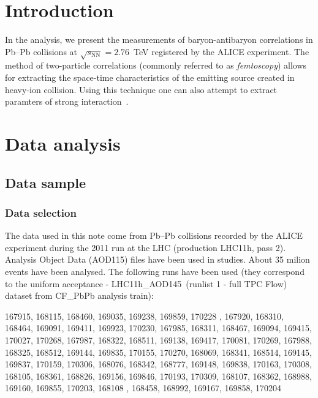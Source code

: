 \newpage
\section{Introduction}
\label{sec:overview}
In the analysis, we present the measurements of baryon-antibaryon correlations in Pb--Pb collisions at $\sqrt{s_{\mathrm{NN}}}=2.76$~TeV registered by the ALICE experiment. The method of two-particle correlations (commonly referred to as \emph{femtoscopy})  allows for extracting the space-time characteristics of the emitting source created in heavy-ion collision. Using this technique one can also attempt to extract paramters of strong interaction~\cite{}.

\section{Data analysis}
\label{sec:analysis}
\subsection{Data sample}
\subsubsection{Data selection}
The data used in this note come from Pb--Pb collisions recorded by the ALICE experiment during the 2011 run at the LHC (production LHC11h, pass 2). Analysis Object Data (AOD115) files have been used in studies. About 35 milion events have been analysed. The following runs have been used
(they correspond to the uniform acceptance - LHC11h\_AOD145\ (runlist 1 - full TPC Flow) dataset from  CF\_PbPb analysis train):

167915, 168115, 168460, 169035, 169238, 169859, 170228 , 167920, 168310, 168464, 169091, 169411, 169923, 170230, 167985, 168311, 168467, 169094, 169415, 170027, 170268, 167987, 168322, 168511, 169138, 169417, 170081, 170269, 167988, 168325, 168512, 169144, 169835, 170155, 170270, 168069, 168341, 168514, 169145, 169837, 170159, 170306, 168076, 168342, 168777, 169148, 169838, 170163, 170308, 168105, 168361, 168826, 169156, 169846, 170193, 170309, 168107, 168362, 168988, 169160, 169855, 170203, 168108 , 168458, 168992, 169167, 169858, 170204


